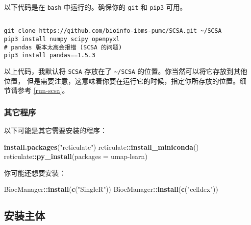 \documentclass[
]{article}
\newenvironment{Shaded}{\begin{snugshade}}{\end{snugshade}}
\newcommand{\DataTypeTok}[1]{\textcolor[rgb]{0.13,0.29,0.53}{#1}}
\newcommand{\KeywordTok}[1]{\textcolor[rgb]{0.13,0.29,0.53}{\textbf{#1}}}
\newcommand{\NormalTok}[1]{#1}
\newcommand{\OperatorTok}[1]{\textcolor[rgb]{0.81,0.36,0.00}{\textbf{#1}}}
\newcommand{\StringTok}[1]{\textcolor[rgb]{0.31,0.60,0.02}{#1}}
\begin{document}
以下代码是在 \texttt{bash} 中运行的。确保你的 \texttt{git} 和 \texttt{pip3} 可用。

\begin{tcolorbox}[colback = gray!10, colframe = red!50, width = 16cm, arc = 1mm, auto outer arc, title = {Bash input}]
\begin{verbatim}

git clone https://github.com/bioinfo-ibms-pumc/SCSA.git ~/SCSA
pip3 install numpy scipy openpyxl
# pandas 版本太高会报错 (SCSA 的问题)
pip3 install pandas==1.5.3

\end{verbatim}
\end{tcolorbox}

以上代码，我默认将 \texttt{SCSA} 存放在了 \texttt{\textasciitilde{}/SCSA} 的位置。你当然可以将它存放到其他位置，
但是需要注意，这意味着你要在运行它的时候，指定你所存放的位置。细节请参考 \ref{run-scsa}。

\hypertarget{installOthers}{%
\subsubsection{其它程序}\label{installOthers}}

以下可能是其它需要安装的程序：

\begin{Shaded}
\begin{Highlighting}[]
\KeywordTok{install.packages}\NormalTok{(}\StringTok{"reticulate"}\NormalTok{)}
\NormalTok{reticulate}\OperatorTok{::}\KeywordTok{install\_miniconda}\NormalTok{()}
\NormalTok{reticulate}\OperatorTok{::}\KeywordTok{py\_install}\NormalTok{(}\DataTypeTok{packages =} \StringTok{\textquotesingle{}umap{-}learn\textquotesingle{}}\NormalTok{)}
\end{Highlighting}
\end{Shaded}

你可能还想要安装：

\begin{Shaded}
\begin{Highlighting}[]
\NormalTok{BiocManager}\OperatorTok{::}\KeywordTok{install}\NormalTok{(}\KeywordTok{c}\NormalTok{(}\StringTok{"SingleR"}\NormalTok{))}
\NormalTok{BiocManager}\OperatorTok{::}\KeywordTok{install}\NormalTok{(}\KeywordTok{c}\NormalTok{(}\StringTok{"celldex"}\NormalTok{))}
\end{Highlighting}
\end{Shaded}

\hypertarget{ux5b89ux88c5ux4e3bux4f53}{%
\subsection{安装主体}\label{ux5b89ux88c5ux4e3bux4f53}}
\end{document}
